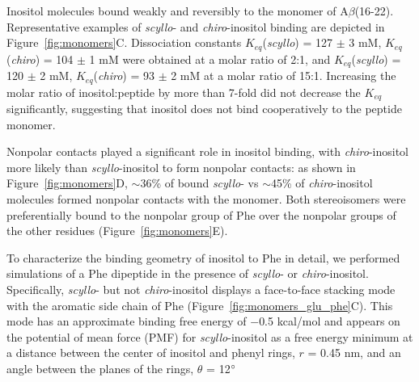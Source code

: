 Inositol molecules bound weakly and reversibly to the monomer of A$\beta$(16-22). Representative examples of \emph{scyllo}- and \emph{chiro}-inositol binding are depicted in Figure~\ref{fig:monomers}C. Dissociation constants $K_{eq}$(\emph{scyllo}) = 127 $\pm$ 3 mM, $K_{eq}$(\emph{chiro}) = 104 $\pm$ 1 mM were obtained at a molar ratio of 2:1, and $K_{eq}$(\emph{scyllo}) = 120 $\pm$ 2 mM, $K_{eq}$(\emph{chiro}) = 93 $\pm$ 2 mM at a molar ratio of 15:1. Increasing the molar ratio of inositol:peptide by more than 7-fold  did not decrease the $K_{eq}$ significantly, suggesting that inositol does not bind cooperatively to the peptide monomer.

Nonpolar contacts played a significant role in inositol binding, with \emph{chiro}-inositol more likely than \emph{scyllo}-inositol to form nonpolar contacts: as shown in Figure~{\ref{fig:monomers}}D, $\sim$36\% of bound \emph{scyllo}- vs $\sim$45\% of \emph{chiro}-inositol molecules formed nonpolar contacts with the monomer. Both stereoisomers were preferentially bound to the nonpolar group of Phe over the nonpolar groups of the other residues (Figure~\ref{fig:monomers}E).

To characterize the binding geometry of inositol to Phe in detail, we performed simulations of a Phe dipeptide in the presence of \emph{scyllo}- or \emph{chiro}-inositol. Specifically, \emph{scyllo}- but not \emph{chiro}-inositol displays a face-to-face stacking mode with the aromatic side chain of Phe (Figure~\ref{fig:monomers_glu_phe}C). This mode has an approximate binding free energy of $-$0.5 kcal/mol and appears on the potential of mean force (PMF) for \emph{scyllo}-inositol as a free energy minimum at a distance between the center of inositol and phenyl rings, $r$ = 0.45 nm, and an angle between the planes of the rings, $\theta$ = 12$^\circ$


